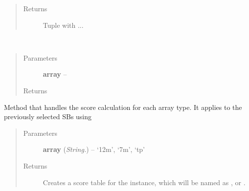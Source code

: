 \documentclass[a4paper,10pt,english]{sphinxmanual}
\begin{document}
\begin{fulllineitems}
\begin{fulllineitems}
\begin{quote}
\begin{description}
\item[{Returns}] \leavevmode
Tuple with ...

\end{description}\end{quote}

\end{fulllineitems}


\begin{fulllineitems}
\label{wtoapi:wtoAlgorithm.WtoAlgorithm.check_observability}~\begin{quote}\begin{description}
\item[{Parameters}] \leavevmode
\textbf{array} -- 

\item[{Returns}] \leavevmode


\end{description}\end{quote}

\end{fulllineitems}


\begin{fulllineitems}
\label{wtoapi:wtoAlgorithm.WtoAlgorithm.query_arrays}
\end{fulllineitems}


\begin{fulllineitems}
\label{wtoapi:wtoAlgorithm.WtoAlgorithm.scorer}
Method that handles the score calculation for each array type. It
applies  to the previously selected SBs using
\begin{quote}\begin{description}
\item[{Parameters}] \leavevmode
\textbf{array} (\emph{String.}) -- `12m', `7m', `tp'

\item[{Returns}] \leavevmode
Creates a score table for the instance, which will be named as
,  or .


\end{description}
\end{quote}
\end{fulllineitems}
\end{fulllineitems}
\end{document}
